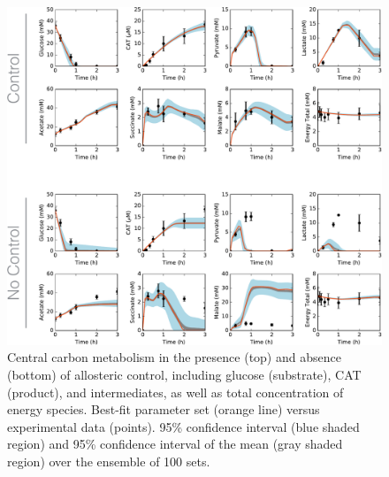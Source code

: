 \documentclass[12pt]{article}
\begin{document}
\clearpage



\clearpage


\begin{figure}[ht]
\centering
\includegraphics[width=1.00\textwidth]{./Figures/allostericControl_noindex.pdf}
\caption{Central carbon metabolism in the presence (top) and absence (bottom) of allosteric control, including glucose (substrate), CAT (product), and intermediates, as well as total concentration of energy species. Best-fit parameter set (orange line) versus experimental data (points). 95\% confidence interval (blue shaded region) and 95\% confidence interval of the mean (gray shaded region) over the ensemble of 100 sets.}
\label{fig:CarbonBoth}
\end{figure}
\end{document}
